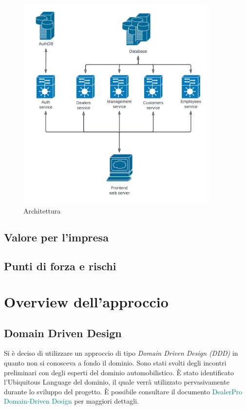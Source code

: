 \documentclass{article}
\begin{document}
  \begin{figure}[h!]
    \centering
    \includegraphics[width=0.9\textwidth]{imgs/arch.png}
    \caption{Architettura}
    \label{fig:arch}
  \end{figure}

  \subsection{Valore per l'impresa}
  \subsection{Punti di forza e rischi}


  \newpage
  \section{Overview dell'approccio}

  \subsection{Domain Driven Design}

  Si è deciso di utilizzare un approccio di tipo \emph{Domain Driven Design (DDD)} in quanto non si conosceva 
  a fondo il dominio. Sono stati svolti degli incontri preliminari con degli esperti del 
  dominio automobilistico. È stato identificato l’Ubiquitous Language del dominio, il quale verrà utilizzato 
  pervasivamente durante lo sviluppo del progetto. 
  È possibile consultare il documento \textcolor{teal}{DealerPro Domain-Driven Design} per maggiori dettagli.
\end{document}
